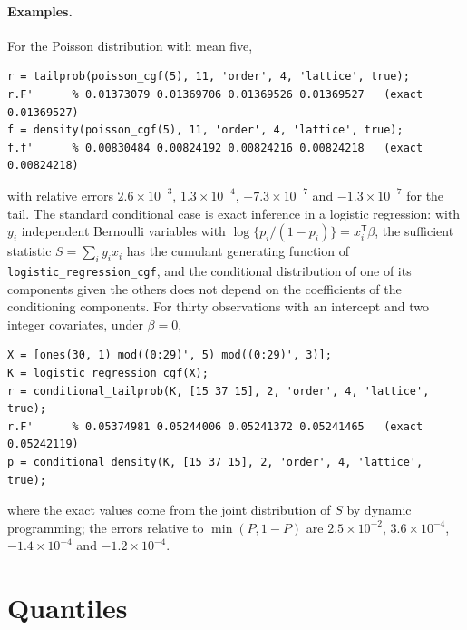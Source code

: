 \documentclass[11pt]{article}
\newcommand{\prog}[1]{\texttt{#1}}
\newcommand{\tp}{^{\mathsf T}}
\begin{document}
\paragraph{Examples.} For the Poisson distribution with mean five,
\begin{lstlisting}
r = tailprob(poisson_cgf(5), 11, 'order', 4, 'lattice', true);
r.F'      % 0.01373079 0.01369706 0.01369526 0.01369527   (exact 0.01369527)
f = density(poisson_cgf(5), 11, 'order', 4, 'lattice', true);
f.f'      % 0.00830484 0.00824192 0.00824216 0.00824218   (exact 0.00824218)
\end{lstlisting}
with relative errors $2.6\times10^{-3}$, $1.3\times10^{-4}$, $-7.3\times10^{-7}$ and
$-1.3\times10^{-7}$ for the tail. The standard conditional case is exact inference in a logistic
regression: with $y_i$ independent Bernoulli variables with $\log\{p_i/(1-p_i)\}=x_i\tp\beta$, the
sufficient statistic $S=\sum_iy_ix_i$ has the cumulant generating function of
\prog{logistic\_regression\_cgf}, and the conditional distribution of one of its components given
the others does not depend on the coefficients of the conditioning components. For thirty
observations with an intercept and two integer covariates, under $\beta=0$,
\begin{lstlisting}
X = [ones(30, 1) mod((0:29)', 5) mod((0:29)', 3)];
K = logistic_regression_cgf(X);
r = conditional_tailprob(K, [15 37 15], 2, 'order', 4, 'lattice', true);
r.F'      % 0.05374981 0.05244006 0.05241372 0.05241465   (exact 0.05242119)
p = conditional_density(K, [15 37 15], 2, 'order', 4, 'lattice', true);
\end{lstlisting}
where the exact values come from the joint distribution of $S$ by dynamic programming; the errors
relative to $\min(P,1-P)$ are $2.5\times10^{-2}$, $3.6\times10^{-4}$, $-1.4\times10^{-4}$ and
$-1.2\times10^{-4}$.

\section{Quantiles}\label{sec:quant}
\end{document}
